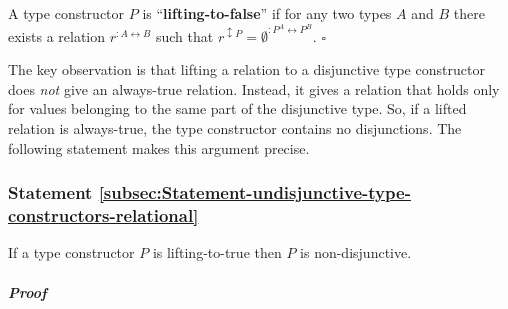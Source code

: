 A type constructor $P$ is \textsf{``}\textbf{lifting-to-false}\textsf{''}
if for any two types $A$ and $B$ there exists a relation $r^{:A\leftrightarrow B}$
such that $r^{\updownarrow P}=\emptyset^{:P^{A}\leftrightarrow P^{B}}$.
$\square$

The key observation is that lifting a relation to a disjunctive type
constructor does \emph{not} give an always-true relation. Instead,
it gives a relation that holds only for values belonging to the same
part of the disjunctive type. So, if a lifted relation is always-true,
the type constructor contains no disjunctions. The following statement
makes this argument precise.

\subsubsection{Statement \label{subsec:Statement-undisjunctive-type-constructors-relational}\ref{subsec:Statement-undisjunctive-type-constructors-relational}}

If a type constructor $P$ is lifting-to-true then $P$ is non-disjunctive.

\subparagraph{Proof}

